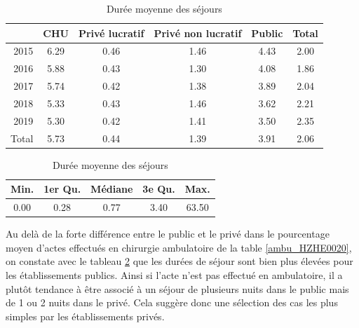 \begin{table}[!ht]
\centering
\caption{Durée moyenne des séjours} 
\label{dms_HZHE0020}
\begin{tabular}{r|cccc|c}
  \hline
 & CHU & Privé lucratif & Privé non lucratif & Public & Total \\ 
  \hline
2015 & 6.29 & 0.46 & 1.46 & 4.43 & 2.00 \\ 
  2016 & 5.88 & 0.43 & 1.30 & 4.08 & 1.86 \\ 
  2017 & 5.74 & 0.42 & 1.38 & 3.89 & 2.04 \\ 
  2018 & 5.33 & 0.43 & 1.46 & 3.62 & 2.21 \\ 
  2019 & 5.30 & 0.42 & 1.41 & 3.50 & 2.35 \\ 
  \hline
  Total & 5.73 & 0.44 & 1.39 & 3.91 & 2.06 \\ 
   \hline
\end{tabular}

\bigskip

\begin{tabular}{ccccc}
  \hline
Min. & 1er Qu. & Médiane & 3e Qu. & Max. \\ 
  \hline
0.00 & 0.28 & 0.77 & 3.40 & 63.50 \\ 
   \hline
\end{tabular}
\end{table}



Au delà de la forte différence entre le public et le privé dans le pourcentage moyen d'actes effectués en chirurgie ambulatoire de la table \ref{ambu_HZHE0020}, on constate avec le tableau \ref{dms_HZHE0020} que les durées de séjour sont bien plus élevées pour les établissements publics. Ainsi si l'acte n'est pas effectué en ambulatoire, il a plutôt tendance à être associé à un séjour de plusieurs nuits dans le public mais de 1 ou 2 nuits dans le privé. Cela suggère donc une sélection des cas les plus simples par les établissements privés.\\

